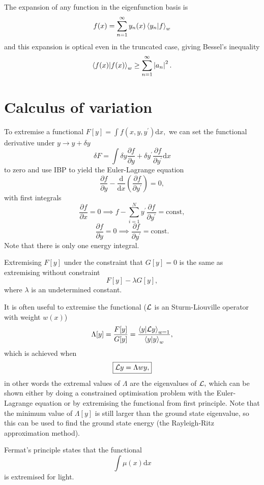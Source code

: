 \documentclass{article}
\begin{document}
The expansion of any function in the eigenfunction basis is 
\[
    f(x) = \sum_{n=1}^{\infty} y_n(x) \braket{y_n}{f}_w
\]
and this expansion is optical even in the truncated case, giving Bessel's inequality
\[
    \braket{f(x)}_w \geq \sum_{n=1}^{\infty} \left\vert a_n \right\vert ^{2}.
\]

\section{Calculus of variation}
To extremise a functional $F[y] = \int f(x, y, y^\prime )\mathrm{d} x,$ we can set the functional derivative under $y \to  y + \delta y$
\[
    \delta F = \int \delta y \frac{\partial f}{\partial y} + \delta y^\prime \frac{\partial f}{\partial y^\prime } \mathrm{d} x
\]
to zero and use IBP to yield the Euler-Lagrange equation
\[
    \boxed{
    \frac{\partial f}{\partial y} - \frac{\mathrm{d}}{\mathrm{d}x} \left( \frac{\partial f}{\partial y^\prime } \right) = 0, }
\]
with first integrals
\[
    \boxed{
    \frac{\partial f}{\partial x} = 0 \implies 
    f - \sum_{i=1}^{N}  y^\prime \frac{\partial f}{\partial y^\prime } = \text{const},}
\]
\[
    \boxed{
    \frac{\partial f}{\partial y} = 0 \implies 
    \frac{\partial f}{\partial y^\prime } = \text{const}. }
\]
Note that there is only one energy integral. 

Extremising $F[y]$ under the constraint that $G[y] = 0$ is the same as extremising without constraint
\[
    F[y] - \lambda  G[y],
\]
where $\lambda $ is an undetermined constant. 

It is often useful to extremise the functional ($\mathcal{\MakeUppercase{L}} $ is an Sturm-Liouville operator with weight $w(x)$)
\[
    \Lambda[y] = \frac{F[y]}{G[y]} = \frac{\braket{y}{\mathcal{\MakeUppercase{L}}  y}_{w=1}}{\braket{y}_w},
\]
which is achieved when 
\[
    \boxed{
    \mathcal{\MakeUppercase{L}} y = \Lambda w y, }
\]
in other words the extremal values of $\Lambda$ are the eigenvalues of $\mathcal{\MakeUppercase{L}}, $ which can be shown either by doing a constrained optimisation problem with the Euler-Lagrange equation or by extremising the functional from first principle. Note that the minimum value of $\Lambda[y]$ is still larger than the ground state eigenvalue, so this can be used to find the ground state energy (the Rayleigh-Ritz approximation method). 

Fermat's principle states that the functional 
\[
    \int \mu(x) \mathrm{d} x
\]
is extremised for light. 
\end{document}
